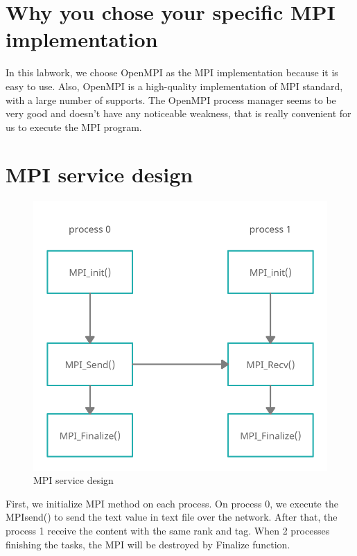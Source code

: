 \documentclass[times, 10pt]{thesisMDH}
\begin{document}
\titlePage

\newpage

\mainmatter

\section{Why you chose your specific MPI implementation}
In this labwork, we choose OpenMPI as the MPI implementation because it is easy to use. Also, OpenMPI is a high-quality implementation of MPI standard, with a large number of supports. The OpenMPI process manager seems to be very good and doesn’t have any noticeable weakness, that is really convenient for us to execute the MPI program.
\section{MPI service design}
\begin{figure}[H]
    \centering
    \includegraphics[width=0.7\linewidth]{images/3-1.png}
    \caption{MPI service design}
    \label{fig:my_label}
\end{figure}
First, we initialize MPI method on each process. On process 0, we execute the MPIsend() to send the text value in text file over the network. After that, the process 1 receive the content with the same rank and tag. When 2 processes finishing the tasks, the MPI will be destroyed by Finalize function.
\end{document}
